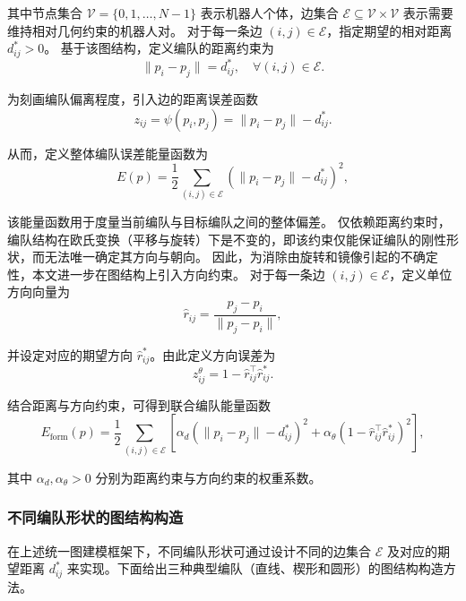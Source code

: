 其中节点集合 $\mathcal{V} = \{0,1,\ldots,N-1\}$ 表示机器人个体，边集合 $\mathcal{E} \subseteq \mathcal{V} \times \mathcal{V}$ 表示需要维持相对几何约束的机器人对。
对于每一条边 $(i,j) \in \mathcal{E}$，指定期望的相对距离 $d_{ij}^* > 0$。
基于该图结构，定义编队的距离约束为
\begin{equation}
    \|p_i - p_j\| = d_{ij}^*, \quad \forall (i,j) \in \mathcal{E}.
\end{equation}

为刻画编队偏离程度，引入边的距离误差函数
\begin{equation}
    z_{ij} = \psi(p_i, p_j) = \|p_i - p_j\| - d_{ij}^*.
\end{equation}

从而，定义整体编队误差能量函数为
\begin{equation}
    E(p) = \frac{1}{2} \sum_{(i,j)\in\mathcal{E}} 
    \left( \|p_i - p_j\| - d_{ij}^* \right)^2,
\end{equation}

该能量函数用于度量当前编队与目标编队之间的整体偏差。
仅依赖距离约束时，编队结构在欧氏变换（平移与旋转）下是不变的，即该约束仅能保证编队的刚性形状，而无法唯一确定其方向与朝向。
因此，为消除由旋转和镜像引起的不确定性，本文进一步在图结构上引入方向约束。
对于每一条边 $(i,j) \in \mathcal{E}$，定义单位方向向量为
\begin{equation}
    \hat{r}_{ij} = \frac{p_j - p_i}{\|p_j - p_i\|},
\end{equation}

并设定对应的期望方向 $\hat{r}_{ij}^*$。由此定义方向误差为
\begin{equation}
    z_{ij}^{\theta} = 1 - \hat{r}_{ij}^\top \hat{r}_{ij}^*.
\end{equation}

结合距离与方向约束，可得到联合编队能量函数
\begin{equation}
    E_{\text{form}}(p) = 
    \frac{1}{2} \sum_{(i,j)\in\mathcal{E}} 
    \left[
    \alpha_d \left( \|p_i - p_j\| - d_{ij}^* \right)^2
    +
    \alpha_\theta \left( 1 - \hat{r}_{ij}^\top \hat{r}_{ij}^* \right)^2
    \right],
\end{equation}

其中 $\alpha_d, \alpha_\theta > 0$ 分别为距离约束与方向约束的权重系数。

\subsubsection{不同编队形状的图结构构造}

在上述统一图建模框架下，不同编队形状可通过设计不同的边集合 $\mathcal{E}$ 及对应的期望距离 $d_{ij}^*$ 来实现。下面给出三种典型编队（直线、楔形和圆形）的图结构构造方法。

